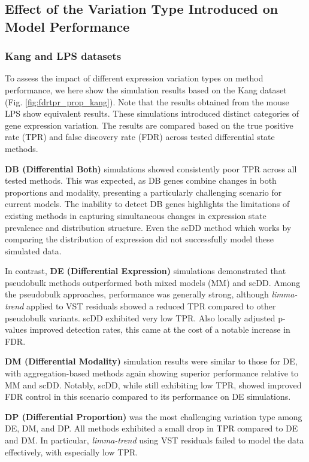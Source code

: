\documentclass[a4paper, 11pt, twocolumn]{article}
\begin{document}
\begin{multicols}{2}
\subsection{Effect of the Variation Type Introduced on Model Performance}

\subsubsection{Kang and LPS datasets}
To assess the impact of different expression variation types on method performance, we here show the simulation results based on the Kang dataset (Fig. \ref{fig:fdrtpr_prop_kang}). Note that the results obtained from the mouse LPS show equivalent results. These simulations introduced distinct categories of gene expression variation. The results are compared based on the true positive rate (TPR) and false discovery rate (FDR) across tested differential state methods.

\textbf{DB (Differential Both)} simulations showed consistently poor TPR across all tested methods. This was expected, as DB genes combine changes in both proportions and modality, presenting a particularly challenging scenario for current models. The inability to detect DB genes highlights the limitations of existing methods in capturing simultaneous changes in expression state prevalence and distribution structure. Even the scDD method which works by comparing the distribution of expression did not successfully model these simulated data.

In contrast, \textbf{DE (Differential Expression)} simulations demonstrated that pseudobulk methods outperformed both mixed models (MM) and scDD. Among the pseudobulk approaches, performance was generally strong, although \textit{limma-trend} applied to VST residuals showed a reduced TPR compared to other pseudobulk variants. scDD exhibited very low TPR. Also locally adjusted p-values improved detection rates, this came at the cost of a notable increase in FDR.

\textbf{DM (Differential Modality)} simulation results were similar to those for DE, with aggregation-based methods again showing superior performance relative to MM and scDD. Notably, scDD, while still exhibiting low TPR, showed improved FDR control in this scenario compared to its performance on DE simulations.

\textbf{DP (Differential Proportion)} was the most challenging variation type among DE, DM, and DP. All methods exhibited a small drop in TPR compared to DE and DM. In particular, \textit{limma-trend} using VST residuals failed to model the data effectively, with especially low TPR.


\end{multicols}
\end{document}

